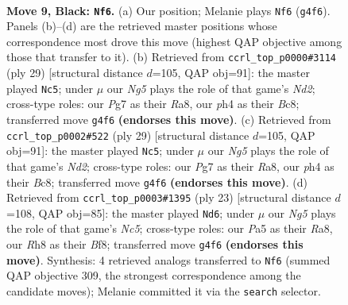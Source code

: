\documentclass[11pt]{article}
\begin{document}
\clearpage

\begin{figure}[p]\centering
\begin{subfigure}{0.46\textwidth}\centering
\resizebox{\linewidth}{!}{%
\newchessgame
\chessboard[
  setfen={rnbqkb1r/1p3ppp/4p3/p1p3N1/2BP2nP/4P3/PP3P2/RNBQ1RK1 b kq - 1 9},
  showmover=false,
  pgfstyle=straightmove, color=movearrow, markmove={g4-f6}
]}
\caption{}
\end{subfigure}\hfill
\begin{subfigure}{0.46\textwidth}\centering
\resizebox{\linewidth}{!}{%
\newchessgame
\chessboard[
  setfen={r1b1k2r/1p1nbppp/1q2p3/3pP1N1/p7/P2B3P/1P3PP1/R1BQR1K1 b kq - 3 15},
  showmover=false,
  pgfstyle=straightmove, color=movearrow, markmove={d7-c5}
]}
\caption{}
\end{subfigure}
\\[4pt]
\begin{subfigure}{0.46\textwidth}\centering
\resizebox{\linewidth}{!}{%
\newchessgame
\chessboard[
  setfen={r1b1k2r/1p1nbppp/1q2p3/3pP1N1/p7/P2B3P/1P3PP1/R1BQR1K1 b kq - 3 15},
  showmover=false,
  pgfstyle=straightmove, color=movearrow, markmove={d7-c5}
]}
\caption{}
\end{subfigure}\hfill
\begin{subfigure}{0.46\textwidth}\centering
\resizebox{\linewidth}{!}{%
\newchessgame
\chessboard[
  setfen={r2qkb1r/1pp2ppp/4b3/pP6/2nB4/P3P3/2Q2PPP/RN2KB1R b KQkq - 2 12},
  showmover=false,
  pgfstyle=straightmove, color=movearrow, markmove={c4-d6}
]}
\caption{}
\end{subfigure}
\caption{\textbf{Move 9, Black: \texttt{Nf6}.} (a) Our position; Melanie plays \texttt{Nf6} (\texttt{g4f6}). Panels (b)--(d) are the retrieved master positions whose correspondence most drove this move (highest QAP objective among those that transfer to it). (b) Retrieved from \texttt{ccrl\_top\_p0000\#3114} (ply 29) [structural distance $d$=105, QAP obj=91]: the master played \texttt{Nc5}; under $\mu$ our \emph{Ng5} plays the role of that game's \emph{Nd2}; cross-type roles: our \emph{P}g7 as their \emph{R}a8, our \emph{p}h4 as their \emph{B}c8; transferred move \texttt{g4f6} \textbf{(endorses this move)}. (c) Retrieved from \texttt{ccrl\_top\_p0002\#522} (ply 29) [structural distance $d$=105, QAP obj=91]: the master played \texttt{Nc5}; under $\mu$ our \emph{Ng5} plays the role of that game's \emph{Nd2}; cross-type roles: our \emph{P}g7 as their \emph{R}a8, our \emph{p}h4 as their \emph{B}c8; transferred move \texttt{g4f6} \textbf{(endorses this move)}. (d) Retrieved from \texttt{ccrl\_top\_p0003\#1395} (ply 23) [structural distance $d$=108, QAP obj=85]: the master played \texttt{Nd6}; under $\mu$ our \emph{Ng5} plays the role of that game's \emph{Nc5}; cross-type roles: our \emph{P}a5 as their \emph{R}a8, our \emph{R}h8 as their \emph{B}f8; transferred move \texttt{g4f6} \textbf{(endorses this move)}. Synthesis: 4 retrieved analogs transferred to \texttt{Nf6} (summed QAP objective 309, the strongest correspondence among the candidate moves); Melanie committed it via the \texttt{search} selector.}
\label{fig:thought-m17}
\end{figure}
\end{document}
